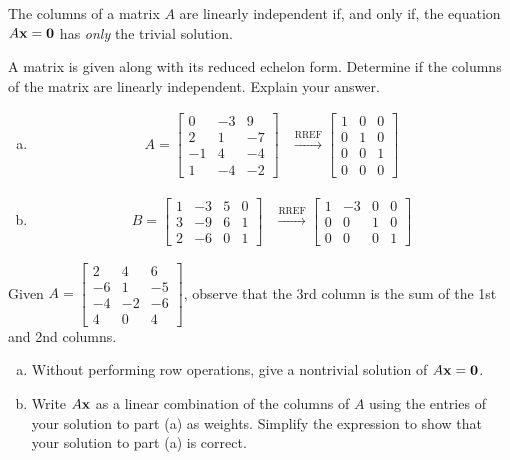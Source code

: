 \begin{boxdef}
	The columns of a matrix $A$ are linearly independent if, and only if, the equation $A\boldsymbol{\mathbf{x}}=\boldsymbol{\mathbf{0}}$ has \emph{only} the trivial solution.
\end{boxdef}
\begin{exercise} %
	A matrix is given along with its reduced echelon form. Determine if the columns of the matrix are linearly independent. Explain your answer.
	\begin{multicols}{2}
		\begin{enumerate}[(a)]
			\item
				\begin{align*}
				A = \begin{bmatrix}0&-3&9\\2&1&-7\\-1&4&-4\\1&-4&-2\end{bmatrix}
				&\xrightarrow{\text{RREF}}
				\begin{bmatrix}1&0&0\\0&1&0\\0&0&1\\0&0&0\end{bmatrix}
				\end{align*}
			\item 
				\begin{align*}
				B = \begin{bmatrix}1&-3&5&0\\3&-9&6&1\\2&-6&0&1\end{bmatrix}
				&\xrightarrow{\text{RREF}}
				\begin{bmatrix}1&-3&0&0\\0&0&1&0\\0&0&0&1\end{bmatrix}
				\end{align*}
		\end{enumerate}
	\end{multicols}
\end{exercise}
\vfill


\newpage


\begin{exercise} %
	Given $A=\begin{bmatrix}2&4&6\\-6&1&-5\\-4&-2&-6\\4&0&4\end{bmatrix}$, observe that the 3rd column is the sum of the 1st and 2nd columns.
		\begin{enumerate}[(a)]
			\item Without performing row operations, give a nontrivial solution of $A\boldsymbol{\mathbf{x}}=\boldsymbol{\mathbf{0}}$.
			\vfill
			\item Write $A\boldsymbol{\mathbf{x}}$ as a linear combination of the columns of $A$ using the entries of your solution to part (a) as weights. Simplify the expression to show that your solution to part (a) is correct.
			\vfill
		\end{enumerate}
\end{exercise}


